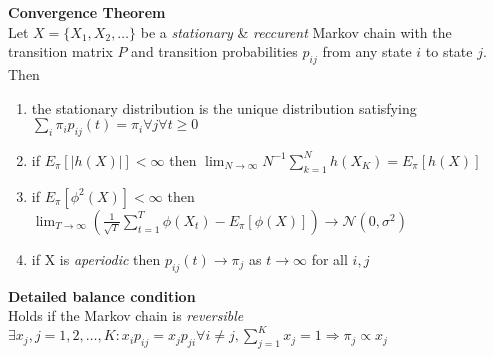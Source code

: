 \documentclass[10pt]{article} %
\begin{document}
\begin{multicols}{4}
{\begin{flushleft}
            \textbf{Convergence Theorem}\\
            Let \(X = \{X_1,X_2,\dots\}\) be a \textit{stationary} \& \textit{reccurent} Markov chain with the transition
            matrix \(P\) and transition probabilities \(p_{ij}\) from any
            state \(i\) to state \(j\). Then
            \begin{enumerate}
                \item the stationary distribution is the unique distribution satisfying \(\sum_{i} \pi_i p_{ij}(t) = \pi_i \forall j \forall t \geq 0\)
                \item if \(E_{\pi}[|h(X)|]<\infty\) then \(\lim_{N \to \infty} N^{-1}\sum_{k=1}^N h(X_K) = E_{\pi}[h(X)]\)
                \item if \(E_{\pi}[\phi^2(X)]<\infty\) then {\tiny \(\lim_{T\to \infty} \left(\frac{1}{\sqrt{T}}\sum_{t=1}^T\phi(X_t)-E_{\pi}[\phi(X)]\right) \to \mathcal{N}(0,\sigma^2)\)}
                \item if X is \textit{aperiodic} then \(p_{ij}(t) \to \pi_j\) as \(t\to \infty\) for all \(i,j\)
            \end{enumerate}

            \textbf{Detailed balance condition}\\
            Holds if the Markov chain is \textit{reversible}\\
            \(\exists x_j, j=1,2,\dots,K : x_ip_{ij} = x_jp_{ji} \forall i\not=j, \sum_{j=1}^K x_j = 1 \Rightarrow \pi_j \propto x_j\)


\end{flushleft}}
\end{multicols}
\end{document}
